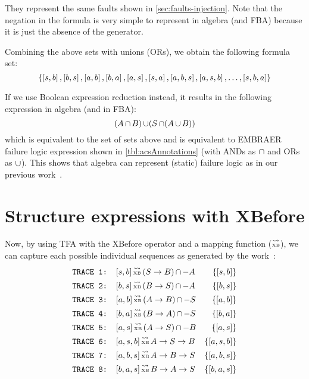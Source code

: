 \documentclass[en,twoside,onehalfspacing,phd]{risethesis}
\newcommand{\EMBRAER}{EMBRAER\xspace}
\def\xbeforeop{\ensuremath\rightarrow}
\newcommand{\xbefore}[2]{\ensuremath #1 \xbeforeop #2 }
\def\tracetoalgebra{\ensuremath\operatorname{\stackrel{\leadsto}{\text{\tiny XB}}}}
\newcommand{\listsin}[1]{\ensuremath\left[ #1 \right]}
\newcommand{\parsin}[1]{\ensuremath\left( #1 \right)}
\def\union{\ensuremath\operatorname{\cup}}
\def\inter{\ensuremath\operatorname{\cap}}
\begin{document}
They represent the same faults shown in \cref{sec:faults-injection}.
Note that the negation in the formula is very simple to represent in \ac{algebra} (and \ac{FBA}) because it is just the absence of the generator.

Combining the above sets with unions (ORs), we obtain the following formula set:
%
\[
\left\{ \listsin{s,b}, \listsin{b,s}, \listsin{a,b}, \listsin{b,a}, \listsin{a,s}, \listsin{s,a}, \listsin{a,b,s}, \listsin{a,s,b},\ldots,\listsin{s,b,a} \right\}
\]

If we use Boolean expression reduction instead, it results in the following expression in \ac{algebra} (and in \ac{FBA}):
\[
(A \inter B) \union (S \inter (A \union B))
\]
%
which is equivalent to the set of sets above and is equivalent to \EMBRAER failure logic expression shown in \cref{tbl:acsAnnotations} (with ANDs as $\inter$ and ORs as $\union$).
%
This shows that \ac{algebra} can represent (static) failure logic as in our previous work~\cite{DM2012}.

\section{Structure expressions with XBefore}
\label{sec:case-study-xbefore}

Now, by using TFA with the XBefore operator and a mapping function ($\tracetoalgebra$), we can capture each possible individual sequences as generated by the work~\cite{DM2012}:
%
\begin{align*}
\text{\texttt{TRACE 1: }}&[s,b] \tracetoalgebra \parsin{\xbefore{S}{B}} \inter -A & \left\{[s,b]\right\}\\
\text{\texttt{TRACE 2: }}&[b,s] \tracetoalgebra \parsin{\xbefore{B}{S}} \inter -A & \left\{[b,s]\right\}\\
\text{\texttt{TRACE 3: }}&[a,b] \tracetoalgebra \parsin{\xbefore{A}{B}} \inter -S & \left\{[a,b]\right\}\\
\text{\texttt{TRACE 4: }}&[b,a] \tracetoalgebra \parsin{\xbefore{B}{A}} \inter -S & \left\{[b,a]\right\}\\
\text{\texttt{TRACE 5: }}&[a,s] \tracetoalgebra \parsin{\xbefore{A}{S}} \inter -B & \left\{[a,s]\right\}\\
\text{\texttt{TRACE 6: }}&[a,s,b] \tracetoalgebra \xbefore{\xbefore{A}{S}}{B} & \left\{[a,s,b]\right\}\\
\text{\texttt{TRACE 7: }}&[a,b,s] \tracetoalgebra \xbefore{\xbefore{A}{B}}{S} & \left\{[a,b,s]\right\}\\
\text{\texttt{TRACE 8: }}&[b,a,s] \tracetoalgebra \xbefore{\xbefore{B}{A}}{S} & \left\{[b,a,s]\right\}
\end{align*}
\end{document}

